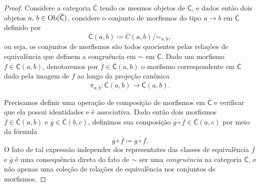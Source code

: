 \begin{proof}
    Considere a categoria $\overline{\mathsf{C}}$ tendo os mesmos objetos de $\mathsf{C}$, e dados então dois objetos $a,\,b \in \mathrm{Ob}(\overline{\mathsf{C}})$, considere o conjunto de morfismos do tipo $a \to b$ em $\overline{\mathsf{C}}$ definido por
    \begin{displaymath}
        \overline{\mathsf{C}}(a,b) \coloneqq \overline{C}(a,b)/\sim_{a,b},
    \end{displaymath}
    ou seja, os conjuntos de morfismos são todos quocientes pelas relações de equivalência que definem a congruência em $\sim$ em $\mathsf{C}$.
    Dado um morfismo $f \in \mathsf{C}(a,b)$, denotaremos por $\overline{f} \in \overline{\mathsf{C}}(a,b)$ o morfismo correspondente em $\overline{\mathsf{C}}$ dado pela imagem de $f$ ao longo da projeção canônica
    \begin{displaymath}
        \pi_{a,b}: \mathsf{C}(a,b) \to \overline{\mathsf{C}}(a,b).
    \end{displaymath}

    Precisamos definir uma operação de composição de morfismos em $\overline{\mathsf{C}}$ e verificar que ela possui identidades e é associativa.
    Dado então dois morfismos $\overline{f} \in \overline{\mathsf{C}}(a,b)$ e $\overline{g} \in \overline{\mathsf{C}}(b,c)$, definimos sua composição $\overline{g} \circ \overline{f} \in \overline{\mathsf{C}}(a,c)$ por meio da fórmula
    \begin{displaymath}
        \overline{g} \circ \overline{f} \coloneqq \overline{g \circ f}.
    \end{displaymath}
    O fato de tal expressão independer dos representates das classes de equivalência $\overline{f}$ e $\overline{g}$ é uma consequência direta do fato de $\sim$ ser uma \emph{congruência} na categoria $\mathsf{C}$, e não apenas uma coleção de relações de equivalência nos conjuntos de morfismos.
    

\end{proof}
